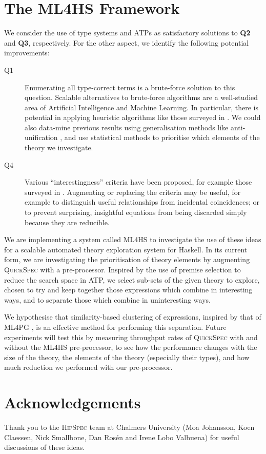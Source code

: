 \documentclass{llncs}
\begin{document}
\section{The \textsc{ML4HS} Framework}\label{ml4hs}

We consider the use of type systems and ATPs as satisfactory solutions to
\textbf{Q2} and \textbf{Q3}, respectively. For the other aspect, we identify
the following potential improvements:

\begin{description}
\item [Q1]
  Enumerating all type-correct terms is a brute-force solution to this question.
  Scalable alternatives to brute-force algorithms are a well-studied area of
  Artificial Intelligence and Machine Learning. In particular, there is
  potential in applying heuristic algorithms like those surveyed in
  \cite{blum2011hybrid}. We could also data-mine previous results using
  generalisation methods like anti-unification \cite{bulychev2010anti}, and
  use statistical methods to prioritise which elements of the theory we
  investigate.
\item [Q4]
  Various ``interestingness'' criteria have been proposed, for example those
  surveyed in \cite{geng2006interestingness}. Augmenting or replacing the
  criteria may be useful, for example to distinguish useful relationships from
  incidental coincidences; or to prevent surprising, insightful equations from
  being discarded simply because they are reducible.
\end{description}

We are implementing a system called \textsc{ML4HS} to investigate the use of
these ideas for a scalable automated theory exploration system for Haskell. In
its current form, we are investigating the prioritisation of theory elements by
augmenting \textsc{QuickSpec} with a pre-processor. Inspired by the use of
premise selection \cite{kuhlwein2012overview} to reduce the search space in ATP,
we select sub-sets of the given theory to explore, chosen to try and keep
together those expressions which combine in interesting ways, and to separate
those which combine in uninteresting ways.

We hypothesise that similarity-based clustering of expressions, inspired by that
of \textsc{ML4PG} \cite{journals/corr/abs-1212-3618}, is an effective method for
performing this separation. Future experiments will test this by measuring
throughput rates of \textsc{QuickSpec} with and without the \textsc{ML4HS}
pre-processor, to see how the performance changes with the size of the theory,
the elements of the theory (especially their types), and how much reduction we
performed with our pre-processor.

\section*{Acknowledgements}

Thank you to the \textsc{HipSpec} team at Chalmers University (Moa Johansson,
Koen Claessen, Nick Smallbone, Dan Ros{\'e}n and Irene Lobo Valbuena) for useful
discussions of these ideas.



\end{document}
